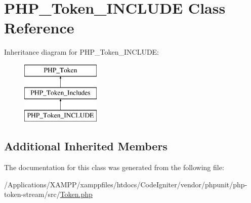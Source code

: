 \hypertarget{class_p_h_p___token___i_n_c_l_u_d_e}{}\section{P\+H\+P\+\_\+\+Token\+\_\+\+I\+N\+C\+L\+U\+DE Class Reference}
\label{class_p_h_p___token___i_n_c_l_u_d_e}
Inheritance diagram for P\+H\+P\+\_\+\+Token\+\_\+\+I\+N\+C\+L\+U\+DE\+:\begin{figure}[H]
\begin{center}
\leavevmode
\includegraphics[height=3.000000cm]{class_p_h_p___token___i_n_c_l_u_d_e}
\end{center}
\end{figure}
\subsection*{Additional Inherited Members}


The documentation for this class was generated from the following file\+:\begin{DoxyCompactItemize}
\item 
/\+Applications/\+X\+A\+M\+P\+P/xamppfiles/htdocs/\+Code\+Igniter/vendor/phpunit/php-\/token-\/stream/src/\mbox{\hyperlink{_token_8php}{Token.\+php}}\end{DoxyCompactItemize}
